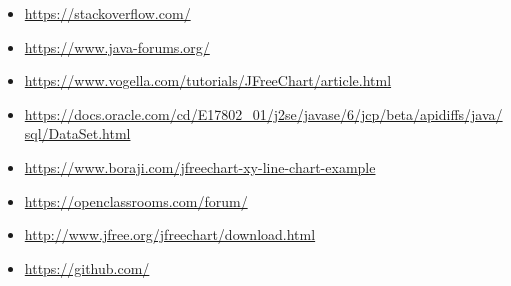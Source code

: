\begin{itemize}
\item \url{https://stackoverflow.com/}
\item \url{https://www.java-forums.org/}
\item \url{https://www.vogella.com/tutorials/JFreeChart/article.html}
\item \url{https://docs.oracle.com/cd/E17802_01/j2se/javase/6/jcp/beta/apidiffs/java/sql/DataSet.html}
\item \url{https://www.boraji.com/jfreechart-xy-line-chart-example}
\item \url{https://openclassrooms.com/forum/}
\item \url{http://www.jfree.org/jfreechart/download.html}
\item \url{https://github.com/}
\end{itemize}
